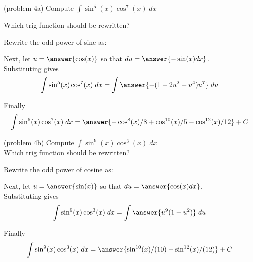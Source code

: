 \documentclass{ximera}
\begin{document}
\begin{problem}{\color{gray}(problem 4a)}
Compute $\displaystyle{\int \sin^5(x)\cos^7(x) \; dx}$

Which trig function should be rewritten?

\begin{multipleChoice}
\end{multipleChoice}

Rewrite the odd power of sine as:
\begin{multipleChoice}
\end{multipleChoice}

Next, let $u = \answer{\cos(x)}$ so that $du = \answer{-\sin(x) dx}$.\\

Substituting gives
\[
\int \sin^5(x)\cos^7(x) \; dx= \int \answer{-(1-2u^2 + u^4)u^7} \; du
\]

Finally
\[
\int \sin^5(x)\cos^7(x) \; dx= \answer{-\cos^8(x)/8 + \cos^{10}(x)/5 - \cos^{12}(x)/12} + C
\]
\end{problem}



\begin{problem}(problem 4b)
Compute $\displaystyle{\int \sin^9(x)\cos^3(x) \; dx}$\\

Which trig function should be rewritten?
\begin{multipleChoice}
\end{multipleChoice}

Rewrite the odd power of cosine as:
\begin{multipleChoice}
\end{multipleChoice}

Next, let $u = \answer{\sin(x)}$ so that $du = \answer{\cos(x) dx}$.\\

Substituting gives
\[
\int \sin^9(x)\cos^3(x) \; dx= \int \answer{u^9(1 - u^2)} \; du
\]

Finally
\[
\int \sin^9(x)\cos^3(x) \; dx= \answer{\sin^{10}(x)/(10) - \sin^{12}(x)/(12) } + C
\]
\end{problem}
\end{document}
